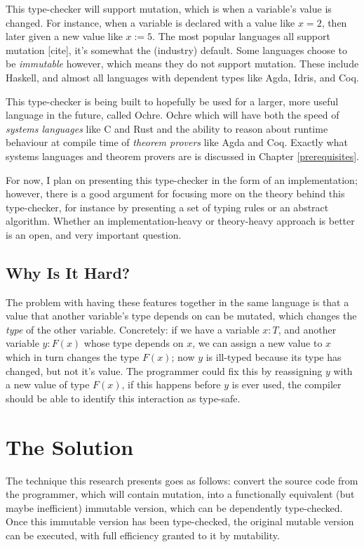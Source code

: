 \documentclass[12pt,twoside]{report}
\begin{document}
This type-checker will support mutation, which is when a variable's value is changed. For instance, when a variable is declared with a value like $x = 2$, then later given a new value like $x := 5$. The most popular languages all support mutation [cite], it's somewhat the (industry) default. Some languages choose to be \textit{immutable} however, which means they do not support mutation. These include Haskell, and almost all languages with dependent types like Agda, Idris, and Coq.

This type-checker is being built to hopefully be used for a larger, more useful language in the future, called Ochre. Ochre which will have both the speed of \textit{systems languages} like C and Rust and the ability to reason about runtime behaviour at compile time of \textit{theorem provers} like Agda and Coq. Exactly what systems languages and theorem provers are is discussed in Chapter \ref{prerequisites}.

For now, I plan on presenting this type-checker in the form of an implementation; however, there is a good argument for focusing more on the theory behind this type-checker, for instance by presenting a set of typing rules or an abstract algorithm. Whether an implementation-heavy or theory-heavy approach is better is an open, and very important question.

\subsection{Why Is It Hard?}
The problem with having these features together in the same language is that a value that another variable's type depends on can be mutated, which changes the \textit{type} of the other variable. Concretely: if we have a variable $x: T$, and another variable $y: F(x)$ whose type depends on $x$, we can assign a new value to $x$ which in turn changes the type $F(x)$; now $y$ is ill-typed because its type has changed, but not it's value. The programmer could fix this by reassigning $y$ with a new value of type $F(x)$, if this happens before $y$ is ever used, the compiler should be able to identify this interaction as type-safe.

\section{The Solution}
\label{thesolution}
The technique this research presents goes as follows: convert the source code from the programmer, which will contain mutation, into a functionally equivalent (but maybe inefficient) immutable version, which can be dependently type-checked. Once this immutable version has been type-checked, the original mutable version can be executed, with full efficiency granted to it by mutability.
\end{document}
